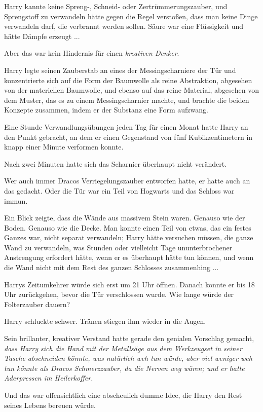 Harry kannte keine Spreng-, Schneid- oder Zertrümmerungszauber, und Sprengstoff
zu verwandeln hätte gegen die Regel verstoßen, dass man keine Dinge verwandeln
darf, die verbrannt werden sollen. Säure war eine Flüssigkeit und hätte Dämpfe
erzeugt ...

Aber das war kein Hindernis für einen \emph{kreativen Denker}.

Harry legte seinen Zauberstab an eines der Messingscharniere der Tür und
konzentrierte sich auf die Form der Baumwolle als reine Abstraktion, abgesehen
von der materiellen Baumwolle, und ebenso auf das reine Material, abgesehen von
dem Muster, das es zu einem Messingscharnier machte, und brachte die beiden
Konzepte zusammen, indem er der Substanz eine Form aufzwang.

Eine Stunde Verwandlungsübungen jeden Tag für einen Monat hatte Harry an den
Punkt gebracht, an dem er einen Gegenstand von fünf Kubikzentimetern in knapp
einer Minute verformen konnte.

Nach zwei Minuten hatte sich das Scharnier überhaupt nicht verändert.

Wer auch immer Dracos Verriegelungszauber entworfen hatte, er hatte auch an das
gedacht. Oder die Tür war ein Teil von Hogwarts und das Schloss war immun.

Ein Blick zeigte, dass die Wände aus massivem Stein waren. Genauso wie der
Boden. Genauso wie die Decke. Man konnte einen Teil von etwas, das ein festes
Ganzes war, nicht separat verwandeln; Harry hätte versuchen müssen, die ganze
Wand zu verwandeln, was Stunden oder vielleicht Tage ununterbrochener
Anstrengung erfordert hätte, wenn er es überhaupt hätte tun können, und wenn die
Wand nicht mit dem Rest des ganzen Schlosses zusammenhing ...

Harrys Zeitumkehrer würde sich erst um 21 Uhr öffnen. Danach konnte er bis 18
Uhr zurückgehen, bevor die Tür verschlossen wurde. Wie lange würde der
Folterzauber dauern?

Harry schluckte schwer. Tränen stiegen ihm wieder in die Augen.

Sein brillanter, kreativer Verstand hatte gerade den genialen Vorschlag gemacht,
\emph{dass Harry sich die Hand mit der Metallsäge aus dem Werkzeugset in seiner
Tasche abschneiden könnte, was natürlich weh tun würde, aber viel weniger weh
tun könnte als Dracos Schmerzzauber, da die Nerven weg wären; und er hatte
Aderpressen im Heilerkoffer.}

Und das war offensichtlich eine abscheulich dumme Idee, die Harry den Rest
seines Lebens bereuen würde.

